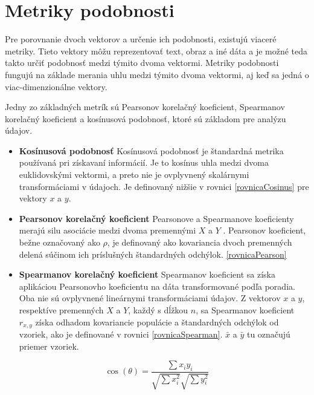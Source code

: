 \section{Metriky podobnosti} \label{podobnost}

Pre porovnanie dvoch vektorov a určenie ich podobnosti, existujú viaceré metriky. Tieto vektory môžu reprezentovať text, obraz a iné dáta a je možné teda takto určiť podobnosť medzi týmito dvoma vektormi. Metriky podobnosti fungujú na základe merania uhlu medzi týmito dvoma vektormi, aj keď sa jedná o viac-dimenzionálne vektory. 

Jedny zo základných metrík sú Pearsonov korelačný koeficient, Spearmanov korelačný koeficient a kosínusová podobnosť, ktoré sú základom pre analýzu údajov.

\begin{itemize}
    \item \textbf{Kosínusová podobnosť} Kosínusová podobnosť je štandardná metrika používaná pri získavaní informácií. Je to kosínus uhla medzi dvoma euklidovskými vektormi, a preto nie je ovplyvnený skalárnymi transformáciami v údajoch. Je definovaný nižšie v rovnici \eqref{rovnicaCosinus} pre vektory \(x\) a \(y\).
    
    \item \textbf{Pearsonov korelačný koeficient} Pearsonove a Spearmanove koeficienty merajú silu asociácie medzi dvoma premennými \(X\) a \(Y\) . Pearsonov koeficient, bežne označovaný ako \(\rho\), je definovaný ako kovariancia dvoch premenných delená súčinom ich príslušných štandardných odchýlok. \eqref{rovnicaPearson}
    
    \item \textbf{Spearmanov korelačný koeficient} Spearmanov koeficient sa získa aplikáciou Pearsonovho koeficientu na dáta transformované podľa poradia. Oba nie sú ovplyvnené lineárnymi transformáciami údajov. Z vektorov \(x\) a \(y\), respektíve premenných \(X\) a \(Y\), každý s dĺžkou \(n\), sa Spearmanov koeficient \(r_{x,y}\) získa odhadom kovariancie populácie a štandardných odchýlok od vzoriek, ako je definované v rovnici \eqref{rovnicaSpearman}. \(\bar{x}\) a \(\bar{y}\) tu označujú priemer vzoriek. \cite{Dongen:2012}
\end{itemize}

\begin{equation}
	\cos(\theta) =  \dfrac{\sum{x_{i}y_{i}}}{\sqrt{\sum{x_{i}^2}}\sqrt{\sum{y_{i}^2}}} \label{rovnicaCosinus}
\end{equation}


